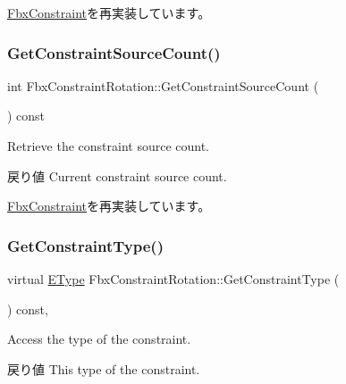 \hyperlink{class_fbx_constraint_a5ff6fe6fc98af1e33e8b297bc1cea007}{Fbx\+Constraint}を再実装しています。

\mbox{\label{class_fbx_constraint_rotation_ab27178d5b53654eb9f41f6e3f3a4c5dc}} 
\subsubsection{\texorpdfstring{Get\+Constraint\+Source\+Count()}{GetConstraintSourceCount()}}
{\footnotesize\ttfamily int Fbx\+Constraint\+Rotation\+::\+Get\+Constraint\+Source\+Count (\begin{DoxyParamCaption}{ }\end{DoxyParamCaption}) const\hspace{0.3cm}{\ttfamily [virtual]}}

Retrieve the constraint source count. \begin{DoxyReturn}{戻り値}
Current constraint source count. 
\end{DoxyReturn}


\hyperlink{class_fbx_constraint_aa702f86c6a1832ce3b4905911e66c58f}{Fbx\+Constraint}を再実装しています。

\mbox{\label{class_fbx_constraint_rotation_a8d9f54ac347d18a0871eafc21e88cb77}} 
\subsubsection{\texorpdfstring{Get\+Constraint\+Type()}{GetConstraintType()}}
{\footnotesize\ttfamily virtual \hyperlink{class_fbx_constraint_a49c1634663395eab7c28856df233ec66}{E\+Type} Fbx\+Constraint\+Rotation\+::\+Get\+Constraint\+Type (\begin{DoxyParamCaption}{ }\end{DoxyParamCaption}) const\hspace{0.3cm}{\ttfamily [protected]}, {\ttfamily [virtual]}}

Access the type of the constraint. \begin{DoxyReturn}{戻り値}
This type of the constraint. 
\end{DoxyReturn}


